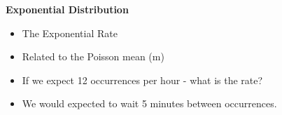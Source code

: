\medskip




\textbf{Exponential Distribution}
\begin{itemize}
\item The Exponential Rate
\item Related to the Poisson mean (m)
\item If we expect 12 occurrences per hour - what is the rate?
\item We would expected to wait 5 minutes between occurrences.
\end{itemize}
\medskip

